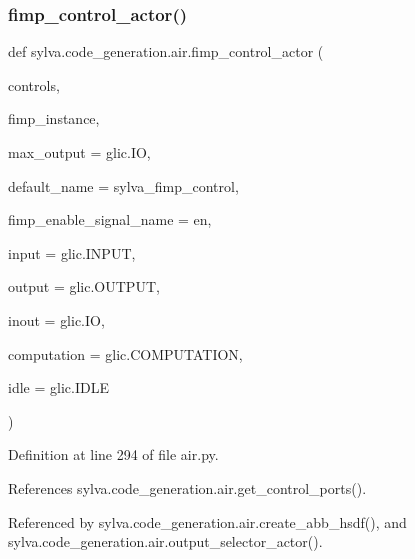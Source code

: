 \subsubsection{\texorpdfstring{fimp\+\_\+control\+\_\+actor()}{fimp\_control\_actor()}}
{\footnotesize\ttfamily def sylva.\+code\+\_\+generation.\+air.\+fimp\+\_\+control\+\_\+actor (\begin{DoxyParamCaption}\item[{}]{controls,  }\item[{}]{fimp\+\_\+instance,  }\item[{}]{max\+\_\+output = {\ttfamily glic.IO},  }\item[{}]{default\+\_\+name = {\ttfamily \textquotesingle{}sylva\+\_\+fimp\+\_\+control\textquotesingle{}},  }\item[{}]{fimp\+\_\+enable\+\_\+signal\+\_\+name = {\ttfamily \textquotesingle{}en\textquotesingle{}},  }\item[{}]{input = {\ttfamily glic.INPUT},  }\item[{}]{output = {\ttfamily glic.OUTPUT},  }\item[{}]{inout = {\ttfamily glic.IO},  }\item[{}]{computation = {\ttfamily glic.COMPUTATION},  }\item[{}]{idle = {\ttfamily glic.IDLE} }\end{DoxyParamCaption})}



Definition at line 294 of file air.\+py.



References sylva.\+code\+\_\+generation.\+air.\+get\+\_\+control\+\_\+ports().



Referenced by sylva.\+code\+\_\+generation.\+air.\+create\+\_\+abb\+\_\+hsdf(), and sylva.\+code\+\_\+generation.\+air.\+output\+\_\+selector\+\_\+actor().


